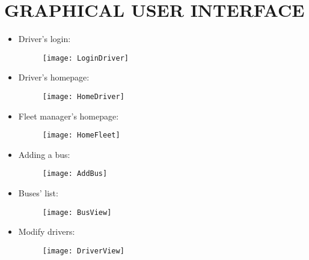 \section{GRAPHICAL USER INTERFACE}
\begin{itemize}
	\item Driver's login:
	\begin{figure}[H]
		\centering
		\texttt{[image: LoginDriver]}
	\end{figure}
\item Driver's homepage:
\begin{figure}[H]
	\centering
	\texttt{[image: HomeDriver]}
\end{figure}
\item Fleet manager's homepage:
\begin{figure}[H]
	\centering
	\texttt{[image: HomeFleet]}
\end{figure}
\newpage
\item Adding a bus:
\begin{figure}[H]
	\centering
	\texttt{[image: AddBus]}
\end{figure}
\newpage
\item Buses' list:
\begin{figure}[H]
	\centering
	\texttt{[image: BusView]}
\end{figure}
\newpage
\item Modify drivers:
\begin{figure}[H]
	\centering
	\texttt{[image: DriverView]}
\end{figure}
\end{itemize}